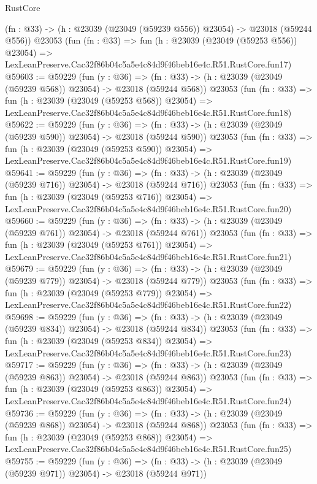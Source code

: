 \begin{lexlean}{RustCore}
\begin{coremodule}
    (fn : @33) -> (h : @23039 (@23049 (@59239 @556)) @23054) -> @23018 (@59244 @556))
    @23053
    (fun (fn : @33) =>
    fun (h : @23039 (@23049 (@59253 @556)) @23054) =>
    LexLeanPreserve.Cac32f86b04c5a5e4c84d9f46beb16e4c.R51.RustCore.fun17)
@59603 := @59229
    (fun (y : @36) =>
    (fn : @33) -> (h : @23039 (@23049 (@59239 @568)) @23054) -> @23018 (@59244 @568))
    @23053
    (fun (fn : @33) =>
    fun (h : @23039 (@23049 (@59253 @568)) @23054) =>
    LexLeanPreserve.Cac32f86b04c5a5e4c84d9f46beb16e4c.R51.RustCore.fun18)
@59622 := @59229
    (fun (y : @36) =>
    (fn : @33) -> (h : @23039 (@23049 (@59239 @590)) @23054) -> @23018 (@59244 @590))
    @23053
    (fun (fn : @33) =>
    fun (h : @23039 (@23049 (@59253 @590)) @23054) =>
    LexLeanPreserve.Cac32f86b04c5a5e4c84d9f46beb16e4c.R51.RustCore.fun19)
@59641 := @59229
    (fun (y : @36) =>
    (fn : @33) -> (h : @23039 (@23049 (@59239 @716)) @23054) -> @23018 (@59244 @716))
    @23053
    (fun (fn : @33) =>
    fun (h : @23039 (@23049 (@59253 @716)) @23054) =>
    LexLeanPreserve.Cac32f86b04c5a5e4c84d9f46beb16e4c.R51.RustCore.fun20)
@59660 := @59229
    (fun (y : @36) =>
    (fn : @33) -> (h : @23039 (@23049 (@59239 @761)) @23054) -> @23018 (@59244 @761))
    @23053
    (fun (fn : @33) =>
    fun (h : @23039 (@23049 (@59253 @761)) @23054) =>
    LexLeanPreserve.Cac32f86b04c5a5e4c84d9f46beb16e4c.R51.RustCore.fun21)
@59679 := @59229
    (fun (y : @36) =>
    (fn : @33) -> (h : @23039 (@23049 (@59239 @779)) @23054) -> @23018 (@59244 @779))
    @23053
    (fun (fn : @33) =>
    fun (h : @23039 (@23049 (@59253 @779)) @23054) =>
    LexLeanPreserve.Cac32f86b04c5a5e4c84d9f46beb16e4c.R51.RustCore.fun22)
@59698 := @59229
    (fun (y : @36) =>
    (fn : @33) -> (h : @23039 (@23049 (@59239 @834)) @23054) -> @23018 (@59244 @834))
    @23053
    (fun (fn : @33) =>
    fun (h : @23039 (@23049 (@59253 @834)) @23054) =>
    LexLeanPreserve.Cac32f86b04c5a5e4c84d9f46beb16e4c.R51.RustCore.fun23)
@59717 := @59229
    (fun (y : @36) =>
    (fn : @33) -> (h : @23039 (@23049 (@59239 @863)) @23054) -> @23018 (@59244 @863))
    @23053
    (fun (fn : @33) =>
    fun (h : @23039 (@23049 (@59253 @863)) @23054) =>
    LexLeanPreserve.Cac32f86b04c5a5e4c84d9f46beb16e4c.R51.RustCore.fun24)
@59736 := @59229
    (fun (y : @36) =>
    (fn : @33) -> (h : @23039 (@23049 (@59239 @868)) @23054) -> @23018 (@59244 @868))
    @23053
    (fun (fn : @33) =>
    fun (h : @23039 (@23049 (@59253 @868)) @23054) =>
    LexLeanPreserve.Cac32f86b04c5a5e4c84d9f46beb16e4c.R51.RustCore.fun25)
@59755 := @59229
    (fun (y : @36) =>
    (fn : @33) -> (h : @23039 (@23049 (@59239 @971)) @23054) -> @23018 (@59244 @971))

\end{coremodule}
\end{lexlean}
